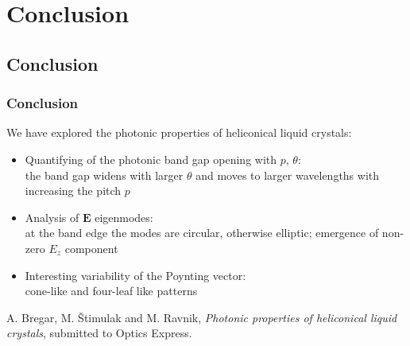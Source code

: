 \documentclass{beamer}
\renewcommand{\vec}{\mathbf}
\newenvironment{slide}[1]{\subsection{#1}\begin{frame}\frametitle{#1}}{\end{frame}}
\begin{document}
\section{Conclusion}

\begin{slide}{Conclusion}
We have explored the photonic properties of heliconical liquid crystals: 
\begin{itemize}
  \item Quantifying of the photonic band gap opening with $p$, $\theta$: \\
  the band gap widens with larger $\theta$ and moves to larger wavelengths with increasing the pitch $p$
  \item Analysis of $\vec{E}$ eigenmodes: \\
  at the band edge the modes are circular, otherwise elliptic; emergence of non-zero $E_z$ component
  \item Interesting variability of the Poynting vector: \\
  cone-like and four-leaf like patterns
  \end{itemize}

 \vspace{1cm}
A. Bregar, M. Štimulak and M. Ravnik, \emph{Photonic properties of heliconical liquid crystals}, submitted to Optics Express. 

\end{slide}


\end{document}
